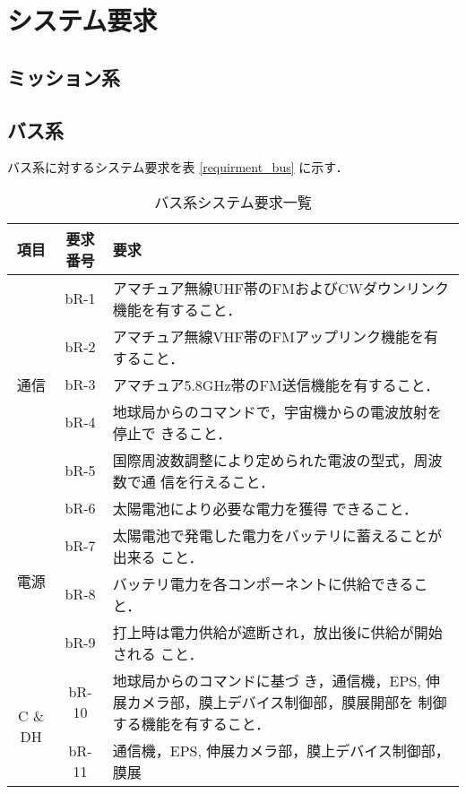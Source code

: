 \section{システム要求}

\subsection{ミッション系}

%

\subsection{バス系}
バス系に対するシステム要求を表 \ref{requirment_bus} に示す．

\begin{table}[htb]
    \centering
    \caption{バス系システム要求一覧}
    \begin{tabular}{|c|c|p{11cm}|} \hline
        項目 & 要求番号 & 要求 \\ \hline
        \multirow{5}{*}{通信} & bR-1 & アマチュア無線UHF帯のFMおよびCWダウンリンク機能を有すること．
        \\ \cline{2-3}
        & bR-2 & アマチュア無線VHF帯のFMアップリンク機能を有すること．
        \\ \cline{2-3}
        & bR-3 & アマチュア5.8GHz帯のFM送信機能を有すること．\\ \cline{2-3}
         & bR-4 & 地球局からのコマンドで，宇宙機からの電波放射を停止で
        きること． \\ \cline{2-3}
        & bR-5 & 国際周波数調整により定められた電波の型式，周波数で通
        信を行えること． \\ \hline
         \multirow{4}{*}{電源} & bR-6 & 太陽電池により必要な電力を獲得
         できること．\\ \cline{2-3}
        & bR-7 & 太陽電池で発電した電力をバッテリに蓄えることが出来る
         こと．  \\ \cline{2-3}
        & bR-8 & バッテリ電力を各コンポーネントに供給できること．\\ \cline{2-3}
         & bR-9 & 打上時は電力供給が遮断され，放出後に供給が開始される
         こと． \\ \hline
         \multirow{5}{*}{C \& DH} & bR-10 & 地球局からのコマンドに基づ
         き，通信機，EPS, 伸展カメラ部，膜上デバイス制御部，膜展開部を
         制御する機能を有すること．\\ \cline{2-3}
        & bR-11 & 通信機，EPS, 伸展カメラ部，膜上デバイス制御部，膜展

\end{tabular}
\end{table}

